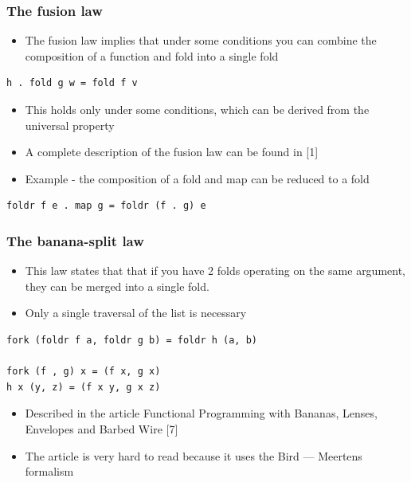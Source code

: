 \documentclass[10pt]{beamer}
\begin{document}
\begin{frame}[fragile]
\frametitle{The fusion law}
\begin{itemize}
\item The fusion law implies that under some conditions you can combine the composition of a function and fold into a single fold 
\end{itemize}

\begin{lstlisting}
h . fold g w = fold f v
\end{lstlisting}

\begin{itemize}
\item This holds only under some conditions, which can be derived from the universal property 
\item A complete description of the fusion law can be found in [1] 
\item Example - the composition of a fold and map can be reduced to a fold
\end{itemize}
\begin{lstlisting}
foldr f e . map g = foldr (f . g) e
\end{lstlisting}
\end{frame}




\begin{frame}[fragile]
\frametitle{The banana-split law}
\begin{itemize}
\item This law states that that if you have 2 folds operating on the same argument, they can be merged into a single fold. 
\item Only a single traversal of the list is necessary 
\end{itemize}

\begin{lstlisting}
fork (foldr f a, foldr g b) = foldr h (a, b)

fork (f , g) x = (f x, g x)
h x (y, z) = (f x y, g x z)
\end{lstlisting}

\begin{itemize}
	\item Described in the article Functional Programming with Bananas, Lenses, Envelopes and Barbed Wire [7]
\item The article is very hard to read because it uses the Bird --- Meertens formalism
\end{itemize}
\end{frame}
\end{document}
